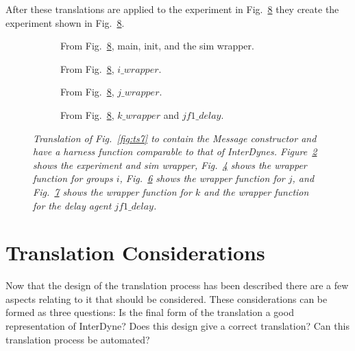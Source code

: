 \documentclass{article}
\begin{document}
After these translations are applied to the experiment in Fig.~\ref{fig:ts8} they create the experiment shown in Fig.~\ref{fig:ts8}.
\begin{figure}[H]
	\centering
	\begin{subfigure}[b]{1\textwidth}
	
	\caption{From Fig.~\ref{fig:ts8}, main, init, and the sim wrapper.}
        \label{fig:ts81}
	\end{subfigure}
	\caption*{}
\end{figure}
	
\begin{figure}[H]\ContinuedFloat
	\centering
	\begin{subfigure}[b]{1\textwidth}
	
	\caption{From Fig.~\ref{fig:ts8}, $i\_wrapper$.}
        \label{fig:ts82}
	\end{subfigure}
	\caption*{}
\end{figure}

\begin{figure}[H]\ContinuedFloat
	\centering
	\begin{subfigure}[b]{1\textwidth}
	
	\caption{From Fig.~\ref{fig:ts8}, $j\_wrapper$.}
        \label{fig:ts83}
	\end{subfigure}
	\caption*{}
\end{figure}
	
\begin{figure}[H]\ContinuedFloat
	\centering
	\begin{subfigure}[b]{1\textwidth}
	
	\caption{From Fig.~\ref{fig:ts8}, $k\_wrapper$ and $jf1\_delay$.}
        \label{fig:ts84}
	\end{subfigure}
	\caption{\it Translation of Fig.~\ref{fig:ts7} to contain the Message constructor and have a harness function comparable to that of InterDynes. Figure~\ref{fig:ts81} shows the experiment and sim wrapper, Fig.~\ref{fig:ts82} shows the wrapper function for groups $i$, Fig.~\ref{fig:ts83} shows the wrapper function for $j$, and Fig.~\ref{fig:ts84} shows the wrapper function for $k$ and the wrapper function for the delay agent $jf1\_delay$.}
	\label{fig:ts8}
\end{figure} 



\section{Translation Considerations}
Now that the design of the translation process has been described there are a few aspects relating to it that should be considered. These considerations can be formed as three questions: Is the final form of the translation a good representation of InterDyne? Does this design give a correct translation? Can this translation process be automated?   
\end{document}
